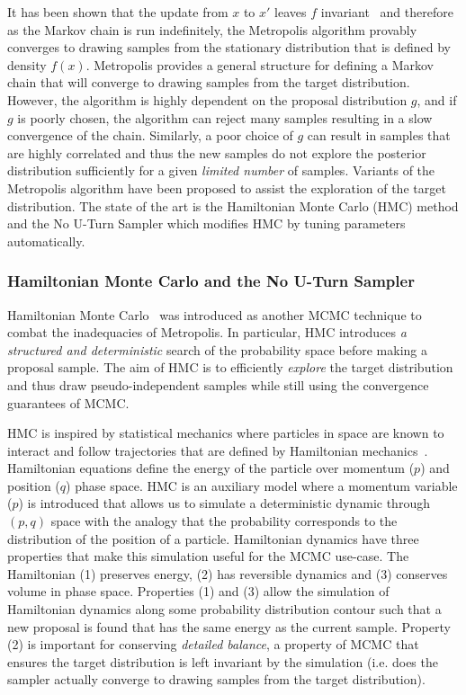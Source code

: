 It has been shown that the update from $x$ to $x'$ leaves $f$ invariant~\citep{mackay1998introduction, gelman2014bayesian} and therefore as the Markov chain is run indefinitely, the Metropolis algorithm provably converges to drawing samples from the stationary distribution that is defined by density $f(x)$. Metropolis provides a general structure for defining a Markov chain that will converge to drawing samples from the target distribution. However, the algorithm is highly dependent on the proposal distribution $g$, and if $g$ is poorly chosen, the algorithm can reject many samples resulting in a slow convergence of the chain. Similarly, a poor choice of $g$ can result in samples that are highly correlated and thus the new samples do not explore the posterior distribution sufficiently for a given \textit{limited number} of samples. Variants of the Metropolis algorithm have been proposed to assist the exploration of the target distribution. The state of the art is the Hamiltonian Monte Carlo (HMC) method and the No U-Turn Sampler which modifies HMC by tuning parameters automatically.

\subsubsection{Hamiltonian Monte Carlo and the No U-Turn Sampler}\label{sec:hmc_nuts}

Hamiltonian Monte Carlo~\citep{neal2011mcmc} was introduced as another MCMC technique to combat the inadequacies of Metropolis. In particular, HMC introduces \textit{a structured and deterministic} search of the probability space before making a proposal sample. The aim of HMC is to efficiently \textit{explore} the target distribution and thus draw pseudo-independent samples while still using the convergence guarantees of MCMC.

HMC is inspired by statistical mechanics where particles in space are known to interact and follow trajectories that are defined by Hamiltonian mechanics~\citep{neal2011mcmc}. Hamiltonian equations define the energy of the particle over momentum ($p$) and position ($q$) phase space. HMC is an auxiliary model where a momentum variable ($p$) is introduced that allows us to simulate a deterministic dynamic through $(p,q)$ space with the analogy that the probability corresponds to the distribution of the position of a particle. Hamiltonian dynamics have three properties that make this simulation useful for the MCMC use-case. The Hamiltonian (1) preserves energy, (2) has reversible dynamics and (3) conserves volume in phase space. Properties (1) and (3) allow the simulation of Hamiltonian dynamics along some probability distribution contour such that a new proposal is found that has the same energy as the current sample. Property (2) is important for conserving \textit{detailed balance}, a property of MCMC that ensures the target distribution is left invariant by the simulation (i.e. does the sampler actually converge to drawing samples from the target distribution).


